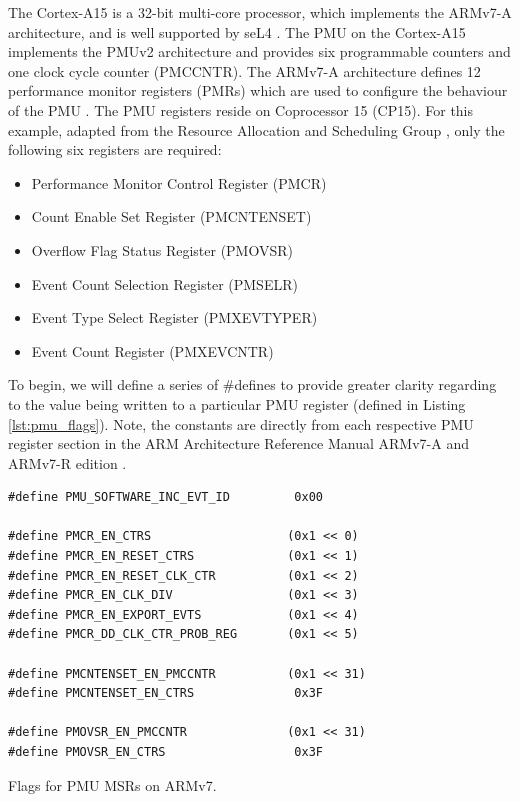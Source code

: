 {The Cortex-A15 is a 32-bit multi-core processor, which implements the ARMv7-A architecture, and is well supported by seL4 \cite{DocsSeL4Hardware}. The PMU on the Cortex-A15 implements the PMUv2 architecture and provides six programmable counters \cite{DocsArmCortexA15PMU} and one clock cycle counter (PMCCNTR). The ARMv7-A architecture defines 12 performance monitor registers (PMRs) which are used to configure the behaviour of the PMU \cite{DocsArmv7PMURegs}. The PMU registers reside on Coprocessor 15 (CP15). For this example, adapted from the Resource Allocation and Scheduling Group \cite{TutHowToUsePMU}, only the following six registers are required:

\ssp

\begin{itemize}
    \item Performance Monitor Control Register (PMCR)
    \item Count Enable Set Register (PMCNTENSET)
    \item Overflow Flag Status Register (PMOVSR)
    \item Event Count Selection Register (PMSELR)
    \item Event Type Select Register (PMXEVTYPER)
    \item Event Count Register (PMXEVCNTR)
\end{itemize}

\dsp

To begin, we will define a series of \#defines to provide greater clarity regarding to the value being written to a particular PMU register (defined in Listing \ref{lst:pmu_flags}). Note, the constants are directly from each respective PMU register section in the ARM Architecture Reference Manual ARMv7-A and ARMv7-R edition \cite{DocsArvm7}.

\begin{listing}
    \begin{verbatim}
#define PMU_SOFTWARE_INC_EVT_ID         0x00

#define PMCR_EN_CTRS                   (0x1 << 0)
#define PMCR_EN_RESET_CTRS             (0x1 << 1)
#define PMCR_EN_RESET_CLK_CTR          (0x1 << 2)
#define PMCR_EN_CLK_DIV                (0x1 << 3)
#define PMCR_EN_EXPORT_EVTS            (0x1 << 4)
#define PMCR_DD_CLK_CTR_PROB_REG       (0x1 << 5)

#define PMCNTENSET_EN_PMCCNTR          (0x1 << 31)
#define PMCNTENSET_EN_CTRS              0x3F

#define PMOVSR_EN_PMCCNTR              (0x1 << 31)
#define PMOVSR_EN_CTRS                  0x3F
    \end{verbatim}
    \caption{Flags for PMU MSRs on ARMv7.}
    \label{lst:pmu_flags}
\end{listing}

}
